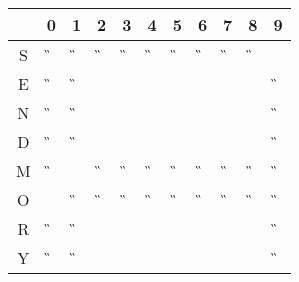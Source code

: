 \begin{tabular}{|c|c|c|c|c|c|c|c|c|c|c|}\hline
  & 0 & 1 & 2 & 3 & 4 & 5 & 6 & 7 & 8 & 9 \\ \hline
S &\G &\G &\G &\G &\G &\G &\G &\G &\G &\A \\ \hline
E &\G &\G &   &   &   &   &   &   &   &\G \\ \hline
N &\G &\G &   &   &   &   &   &   &   &\G \\ \hline
D &\G &\G &   &   &   &   &   &   &   &\G \\ \hline
M &\G &\A &\G &\G &\G &\G &\G &\G &\G &\G \\ \hline
O &\A &\G &\G &\G &\G &\G &\G &\G &\G &\G \\ \hline
R &\G &\G &   &   &   &   &   &   &   &\G \\ \hline
Y & \G&\G &   &   &   &   &   &   &   &\G \\ \hline
\end{tabular}
